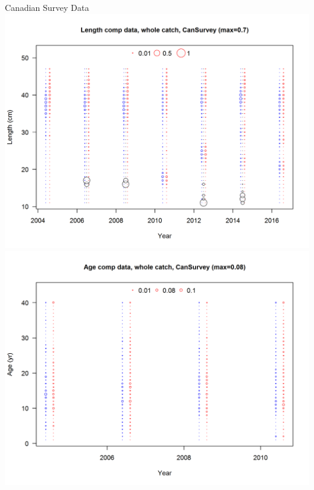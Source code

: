 \documentclass[pdf]{beamer}\usepackage[]{graphicx}\usepackage[]{color}
\begin{document}
\begin{frame}{Canadian Survey Data}
  \includegraphics[scale = 0.37]{figures/CanadianSurvey_LenData.png}
  \includegraphics[scale = 0.37]{figures/CanadianSurvey_AgeData.png}
\end{frame}
\end{document}
